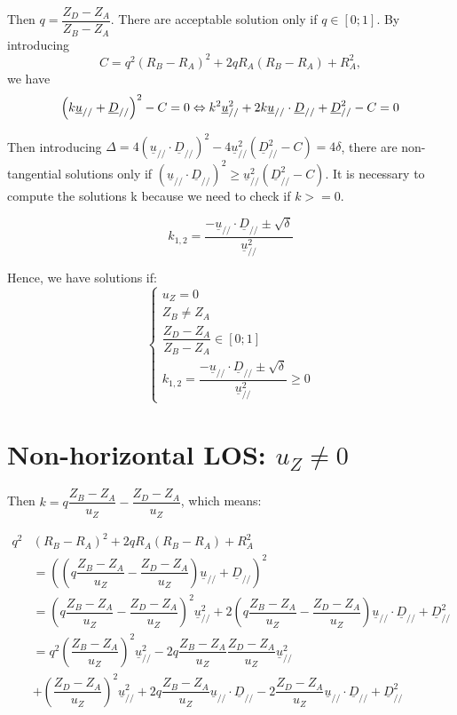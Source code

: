 \documentclass[a4paper,11pt,twoside,titlepage,openright]{book}
\numberwithin{equation}{section}
\newcommand{\ud}[1]{\underline{#1}}
\begin{document}
Then $q=\dfrac{Z_D-Z_A}{Z_B-Z_A}$.
There are acceptable solution only if $q\in[0;1]$. 
By introducing $$C = q^2(R_B-R_A)^2 + 2qR_A(R_B-R_A) + R_A^2,$$ we have
$$
\left(k\ud{u}_{//} + \ud{D}_{//}\right)^2 - C = 0\\
\Leftrightarrow k^2\ud{u}_{//}^2 + 2k\ud{u}_{//}\cdot\ud{D}_{//} + \ud{D}_{//}^2-C = 0
$$

Then introducing $\Delta = 4\left(\ud{u}_{//}\cdot\ud{D}_{//}\right)^2 - 4\ud{u}_{//}^2\left(\ud{D}_{//}^2-C\right) = 4\delta$, there are non-tangential solutions only if $\left(\ud{u}_{//}\cdot\ud{D}_{//}\right)^2 \geq \ud{u}_{//}^2\left(\ud{D}_{//}^2-C\right)$.
It is necessary to compute the solutions k because we need to check if $k>=0$.

$$
k_{1,2} = \dfrac{-\ud{u}_{//}\cdot\ud{D}_{//} \pm \sqrt{\delta}}{\ud{u}_{//}^2}
$$

Hence, we have solutions if:
$$
\left\{
\begin{array}{lll}
u_Z = 0\\
Z_B\neq Z_A\\
\dfrac{Z_D-Z_A}{Z_B-Z_A} \in [0;1]\\
k_{1,2} = \dfrac{-\ud{u}_{//}\cdot\ud{D}_{//} \pm \sqrt{\delta}}{\ud{u}_{//}^2} \geq 0
\end{array}
\right.
$$

\section{Non-horizontal LOS: $u_Z\neq0$}

Then $k=q\dfrac{Z_B-Z_A}{u_Z} - \dfrac{Z_D-Z_A}{u_Z}$, which means:


$$
\begin{array}{lll}
q^2 & (R_B-R_A)^2 + 2qR_A(R_B-R_A) + R_A^2\\
& =\left(\left(q\dfrac{Z_B-Z_A}{u_Z} - \dfrac{Z_D-Z_A}{u_Z}\right)\ud{u}_{//} + \ud{D}_{//}\right)^2\\
& = \left(q\dfrac{Z_B-Z_A}{u_Z} - \dfrac{Z_D-Z_A}{u_Z}\right)^2\ud{u}_{//}^2 + 2\left(q\dfrac{Z_B-Z_A}{u_Z} - \dfrac{Z_D-Z_A}{u_Z}\right)\ud{u}_{//}\cdot\ud{D}_{//} + \ud{D}_{//}^2\\
& =q^2\left(\dfrac{Z_B-Z_A}{u_Z}\right)^2\ud{u}_{//}^2 - 2q\dfrac{Z_B-Z_A}{u_Z}\dfrac{Z_D-Z_A}{u_Z}\ud{u}_{//}^2 \\
& + \left(\dfrac{Z_D-Z_A}{u_Z}\right)^2\ud{u}_{//}^2
+ 2q\dfrac{Z_B-Z_A}{u_Z}\ud{u}_{//}\cdot\ud{D}_{//} - 2\dfrac{Z_D-Z_A}{u_Z}\ud{u}_{//}\cdot\ud{D}_{//} + \ud{D}_{//}^2\\ 
\end{array}
$$
\end{document}
